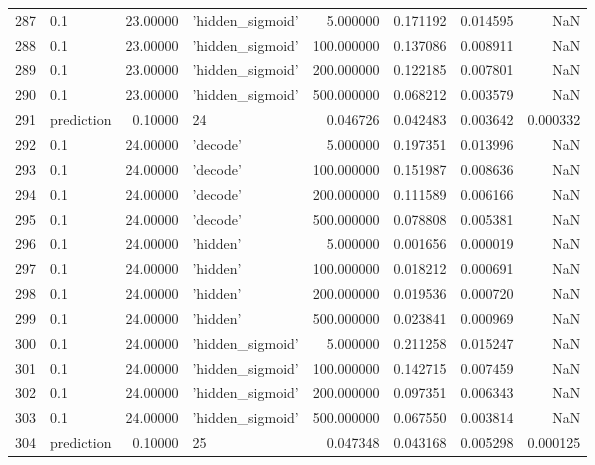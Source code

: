 \documentclass[10pt,a4paper]{article}
\begin{document}
\begin{tabular}{llrlrrrr}
287  &         0.1 &  23.00000 &   'hidden\_sigmoid' &    5.000000 &  0.171192 &  0.014595 &       NaN \\
288  &         0.1 &  23.00000 &   'hidden\_sigmoid' &  100.000000 &  0.137086 &  0.008911 &       NaN \\
289  &         0.1 &  23.00000 &   'hidden\_sigmoid' &  200.000000 &  0.122185 &  0.007801 &       NaN \\
290  &         0.1 &  23.00000 &   'hidden\_sigmoid' &  500.000000 &  0.068212 &  0.003579 &       NaN \\
291  &  prediction &   0.10000 &                 24 &    0.046726 &  0.042483 &  0.003642 &  0.000332 \\
292  &         0.1 &  24.00000 &           'decode' &    5.000000 &  0.197351 &  0.013996 &       NaN \\
293  &         0.1 &  24.00000 &           'decode' &  100.000000 &  0.151987 &  0.008636 &       NaN \\
294  &         0.1 &  24.00000 &           'decode' &  200.000000 &  0.111589 &  0.006166 &       NaN \\
295  &         0.1 &  24.00000 &           'decode' &  500.000000 &  0.078808 &  0.005381 &       NaN \\
296  &         0.1 &  24.00000 &           'hidden' &    5.000000 &  0.001656 &  0.000019 &       NaN \\
297  &         0.1 &  24.00000 &           'hidden' &  100.000000 &  0.018212 &  0.000691 &       NaN \\
298  &         0.1 &  24.00000 &           'hidden' &  200.000000 &  0.019536 &  0.000720 &       NaN \\
299  &         0.1 &  24.00000 &           'hidden' &  500.000000 &  0.023841 &  0.000969 &       NaN \\
300  &         0.1 &  24.00000 &   'hidden\_sigmoid' &    5.000000 &  0.211258 &  0.015247 &       NaN \\
301  &         0.1 &  24.00000 &   'hidden\_sigmoid' &  100.000000 &  0.142715 &  0.007459 &       NaN \\
302  &         0.1 &  24.00000 &   'hidden\_sigmoid' &  200.000000 &  0.097351 &  0.006343 &       NaN \\
303  &         0.1 &  24.00000 &   'hidden\_sigmoid' &  500.000000 &  0.067550 &  0.003814 &       NaN \\
304  &  prediction &   0.10000 &                 25 &    0.047348 &  0.043168 &  0.005298 &  0.000125 \\

\end{tabular}
\end{document}

